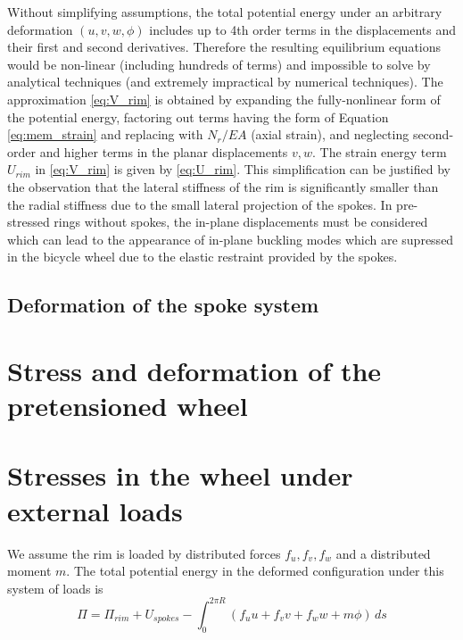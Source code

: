 \documentclass[\rootdir/thesis.tex]{subfiles}
\begin{document}
Without simplifying assumptions, the total potential energy under an arbitrary deformation $(u,v,w,\phi)$ includes up to 4th order terms in the displacements and their first and second derivatives. Therefore the resulting equilibrium equations would be non-linear (including hundreds of terms) and impossible to solve by analytical techniques (and extremely impractical by numerical techniques). The approximation \eqref{eq:V_rim} is obtained by expanding the fully-nonlinear form of the potential energy, factoring out terms having the form of Equation \eqref{eq:mem_strain} and replacing with $N_r/EA$ (axial strain), and neglecting second-order and higher terms in the planar displacements $v,w$. The strain energy term $U_{rim}$ in \eqref{eq:V_rim} is given by \eqref{eq:U_rim}. This simplification can be justified by the observation that the lateral stiffness of the rim is significantly smaller than the radial stiffness due to the small lateral projection of the spokes. In pre-stressed rings without spokes, the in-plane displacements must be considered which can lead to the appearance of in-plane buckling modes which are supressed in the bicycle wheel due to the elastic restraint provided by the spokes.

\subsection{Deformation of the spoke system}



\section{Stress and deformation of the pretensioned wheel}
\label{sec:radial_bulging}



\section{Stresses in the wheel under external loads}

We assume the rim is loaded by distributed forces $f_u,f_v,f_w$ and a distributed moment $m$. The total potential energy in the deformed configuration under this system of loads is
\begin{equation}
\label{eq:TotPot}
\Pi = \Pi_{rim} + U_{spokes} - \int_0^{2\pi R} (f_uu+f_vv+f_ww+m\phi)\, ds
\end{equation}
\end{document}
